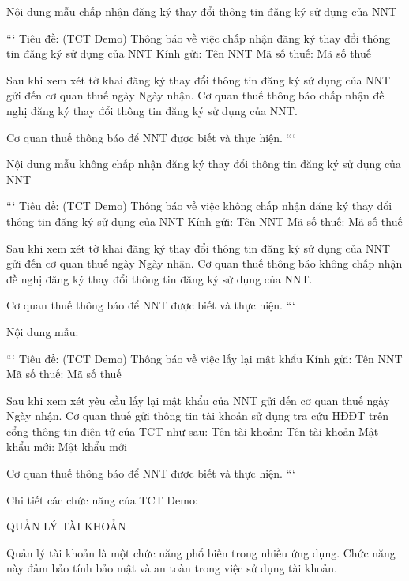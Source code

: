 Nội dung mẫu chấp nhận đăng ký thay đổi thông tin đăng ký sử dụng của NNT

```
Tiêu đề: (TCT Demo) Thông báo về việc chấp nhận đăng ký thay đổi thông tin đăng ký sử dụng của NNT
Kính gửi: {{Tên NNT}}
Mã số thuế: {{Mã số thuế}}

Sau khi xem xét tờ khai đăng ký thay đổi thông tin đăng ký sử dụng của NNT gửi đến cơ quan thuế ngày {{Ngày nhận}}.
Cơ quan thuế thông báo chấp nhận đề nghị đăng ký thay đổi thông tin đăng ký sử dụng của NNT.

Cơ quan thuế thông báo để NNT được biết và thực hiện.
```

Nội dung mẫu không chấp nhận đăng ký thay đổi thông tin đăng ký sử dụng của NNT

```
Tiêu đề: (TCT Demo) Thông báo về việc không chấp nhận đăng ký thay đổi thông tin đăng ký sử dụng của NNT
Kính gửi: {{Tên NNT}}
Mã số thuế: {{Mã số thuế}}

Sau khi xem xét tờ khai đăng ký thay đổi thông tin đăng ký sử dụng của NNT gửi đến cơ quan thuế ngày {{Ngày nhận}}.
Cơ quan thuế thông báo không chấp nhận đề nghị đăng ký thay đổi thông tin đăng ký sử dụng của NNT.

Cơ quan thuế thông báo để NNT được biết và thực hiện.
```



Nội dung mẫu:

```
Tiêu đề: (TCT Demo) Thông báo về việc lấy lại mật khẩu
Kính gửi: {{Tên NNT}}
Mã số thuế: {{Mã số thuế}}

Sau khi xem xét yêu cầu lấy lại mật khẩu của NNT gửi đến cơ quan thuế ngày {{Ngày nhận}}.
Cơ quan thuế gửi thông tin tài khoản sử dụng tra cứu HĐĐT trên cổng thông tin điện tử của TCT như sau:
Tên tài khoản: {{Tên tài khoản}}
Mật khẩu mới: {{Mật khẩu mới}}

Cơ quan thuế thông báo để NNT được biết và thực hiện.
```


Chi tiết các chức năng của TCT Demo:

QUẢN LÝ TÀI KHOẢN

Quản lý tài khoản là một chức năng phổ biến trong nhiều ứng dụng. Chức năng này đảm bảo tính bảo mật và an toàn trong việc sử dụng tài khoản.

